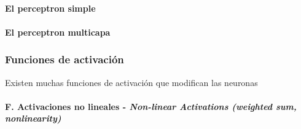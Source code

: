 
\paragraph*{El perceptron simple}
\paragraph*{El perceptron multicapa}





\subsubsection{Funciones de activación}
Existen muchas funciones de activación que modifican las neuronas


\paragraph*{F. Activaciones no lineales - \textit{Non-linear Activations (weighted sum, nonlinearity)} \cite{pytorch2024github}}


